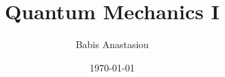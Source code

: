 \documentclass[10pt]{memoir}
\title{\Huge Quantum Mechanics I}
\author{\LARGE Babis Anastasiou}
\date{\vspace{1em}\today}
\begin{document}
 

\begin{titlingpage}
\end{titlingpage}






\end{document}
